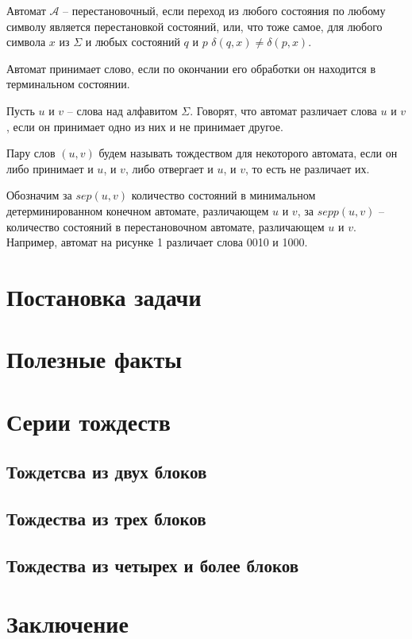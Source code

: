 \begin{definition} 
	Автомат $\mathscr{A}$ – перестановочный, если переход из любого состояния по любому символу является перестановкой состояний, или, что тоже самое, для любого символа $x$ из $\Sigma$ и любых состояний $q$ и $p$ $\delta(q, x) \ne \delta(p, x)$.
\end{definition}
\begin{definition}
	Автомат принимает слово, если по окончании его обработки он находится в терминальном состоянии.
\end{definition}
\begin{definition}
	Пусть $u$ и $v$ – слова над алфавитом $\Sigma$. Говорят, что автомат различает слова $u$ и $v$, если он принимает одно из них и не принимает другое. 
\end{definition}
\begin{definition}
	Пару слов $(u, v)$ будем называть тождеством для некоторого автомата, если он либо принимает и $u$, и $v$, либо отвергает и $u$, и $v$, то есть не различает их.
\end{definition}

Обозначим за $sep(u, v)$ количество состояний в минимальном детерминированном конечном автомате, различающем $u$ и $v$, за $sepp(u, v)$ – количество состояний в перестановочном автомате, различающем $u$ и $v$. 
Например, автомат на рисунке 1 различает слова 0010 и 1000.



\newpage
\section{Постановка задачи}

\newpage
\section{Полезные факты}

\newpage
\section{Серии тождеств}

\subsection{Тождетсва из двух блоков}

\subsection{Тождества из трех блоков}

\subsection{Тождества из четырех и более блоков}

\newpage
\section{Заключение}
